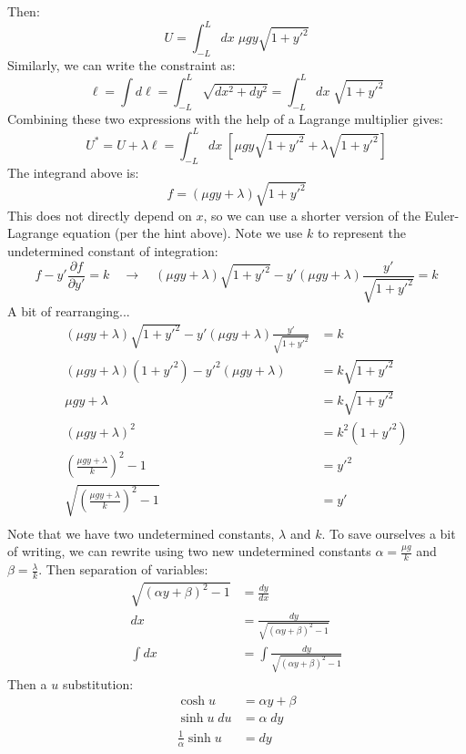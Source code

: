 \documentclass[12pt]{article}
\begin{document}
{Then:
$$
U = \displaystyle \int_{-L}^L dx \; \mu g y \sqrt{1 + y'^2} 
$$
Similarly, we can write the constraint as:
$$
\ell = \displaystyle \int d\ell = \displaystyle \int_{-L}^L \sqrt{dx^2 + dy^2} = \displaystyle \int_{-L}^L dx \; \sqrt{1 + y'^2}
$$
Combining these two expressions with the help of a Lagrange multiplier gives:
$$
U^* = U + \lambda \ell 
=
\displaystyle \int_{-L}^L dx \; \left[ \mu g y \sqrt{1 + y'^2} + \lambda \sqrt{1 + y'^2} \right]
$$
The integrand above is:
$$
f = (\mu g y + \lambda) \sqrt{1 + y'^2}
$$
This does not directly depend on $x$, so we can use a shorter version of the Euler-Lagrange equation (per the hint above). Note we use $k$ to represent the undetermined constant of integration:
$$
f - y' \frac{\partial f}{\partial y'} = k
\quad\rightarrow\quad
(\mu g y + \lambda) \sqrt{1 + y'^2} - y' (\mu g y + \lambda) \frac{y'}{\sqrt{1 + y'^2}} = k
$$
A bit of rearranging...
\begin{align*}
    (\mu g y + \lambda) \sqrt{1 + y'^2} - y' (\mu g y + \lambda) \frac{y'}{\sqrt{1 + y'^2}} &= k \\
    (\mu g y + \lambda) (1 + y'^2) - y'^2 (\mu g y + \lambda) &= k \sqrt{1 + y'^2} \\
    \mu g y + \lambda &= k \sqrt{1 + y'^2} \\
    (\mu g y + \lambda)^2 &= k^2 (1 + y'^2) \\
    \left( \frac{\mu g y + \lambda}{k} \right)^2 - 1 &= y'^2\\
    \sqrt{ \left( \frac{\mu g y + \lambda}{k} \right)^2 - 1 } &= y'\\
\end{align*}
Note that we have two undetermined constants, $\lambda$ and $k$. To save ourselves a bit of writing, we can rewrite using two new undetermined constants $\alpha = \tfrac{\mu g}{k}$ and $\beta = \tfrac{\lambda}{k}$. Then separation of variables:
\begin{align*}
    \sqrt{ \left( \alpha y + \beta \right)^2 - 1 } &= \frac{dy}{dx} \\
    dx &= \frac{dy}{ \sqrt{ \left( \alpha y + \beta \right)^2 - 1 } } \\
    \int dx &= \int \frac{dy}{ \sqrt{ \left( \alpha y + \beta \right)^2 - 1 } }
\end{align*}
Then a $u$ substitution:
\begin{align*}
    \cosh u &= \alpha y + \beta \\
    \sinh u \; du &= \alpha \; dy \\
    \tfrac{1}{\alpha} \sinh u &= dy \\

\end{align*}}
\end{document}
